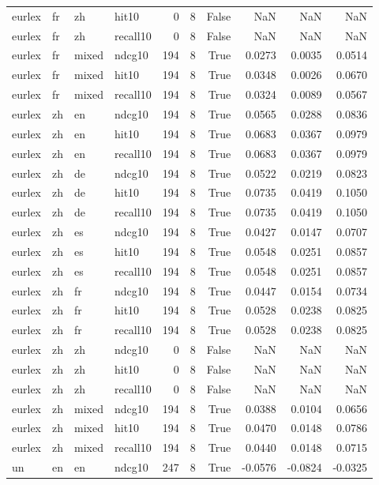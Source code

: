 \begin{tabular}{llllrrrrrr}
eurlex & fr & zh & hit10 & 0 & 8 & False & NaN & NaN & NaN \\
eurlex & fr & zh & recall10 & 0 & 8 & False & NaN & NaN & NaN \\
eurlex & fr & mixed & ndcg10 & 194 & 8 & True & 0.0273 & 0.0035 & 0.0514 \\
eurlex & fr & mixed & hit10 & 194 & 8 & True & 0.0348 & 0.0026 & 0.0670 \\
eurlex & fr & mixed & recall10 & 194 & 8 & True & 0.0324 & 0.0089 & 0.0567 \\
eurlex & zh & en & ndcg10 & 194 & 8 & True & 0.0565 & 0.0288 & 0.0836 \\
eurlex & zh & en & hit10 & 194 & 8 & True & 0.0683 & 0.0367 & 0.0979 \\
eurlex & zh & en & recall10 & 194 & 8 & True & 0.0683 & 0.0367 & 0.0979 \\
eurlex & zh & de & ndcg10 & 194 & 8 & True & 0.0522 & 0.0219 & 0.0823 \\
eurlex & zh & de & hit10 & 194 & 8 & True & 0.0735 & 0.0419 & 0.1050 \\
eurlex & zh & de & recall10 & 194 & 8 & True & 0.0735 & 0.0419 & 0.1050 \\
eurlex & zh & es & ndcg10 & 194 & 8 & True & 0.0427 & 0.0147 & 0.0707 \\
eurlex & zh & es & hit10 & 194 & 8 & True & 0.0548 & 0.0251 & 0.0857 \\
eurlex & zh & es & recall10 & 194 & 8 & True & 0.0548 & 0.0251 & 0.0857 \\
eurlex & zh & fr & ndcg10 & 194 & 8 & True & 0.0447 & 0.0154 & 0.0734 \\
eurlex & zh & fr & hit10 & 194 & 8 & True & 0.0528 & 0.0238 & 0.0825 \\
eurlex & zh & fr & recall10 & 194 & 8 & True & 0.0528 & 0.0238 & 0.0825 \\
eurlex & zh & zh & ndcg10 & 0 & 8 & False & NaN & NaN & NaN \\
eurlex & zh & zh & hit10 & 0 & 8 & False & NaN & NaN & NaN \\
eurlex & zh & zh & recall10 & 0 & 8 & False & NaN & NaN & NaN \\
eurlex & zh & mixed & ndcg10 & 194 & 8 & True & 0.0388 & 0.0104 & 0.0656 \\
eurlex & zh & mixed & hit10 & 194 & 8 & True & 0.0470 & 0.0148 & 0.0786 \\
eurlex & zh & mixed & recall10 & 194 & 8 & True & 0.0440 & 0.0148 & 0.0715 \\
un & en & en & ndcg10 & 247 & 8 & True & -0.0576 & -0.0824 & -0.0325 \\

\end{tabular}
